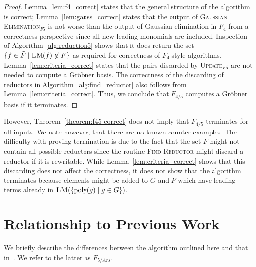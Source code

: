 \begin{proof}
Lemma~\ref{lem:f4_correct} states that the general structure of the algorithm is correct; Lemma~\ref{lem:gauss_correct} states that the output of \textsc{Gaussian Elimination}$_{F5}$ is not worse than the output of Gaussian elimination in $F_4$ from a correctness perspective since all new leading monomials are included. Inspection of Algorithm~\ref{alg:reduction5} shows that it does return the set $\{f \in \tilde{F} \mid \textsc{LM}(f) \not\in F\}$ as required for correctness of $F_4$-style algorithms. Lemma~\ref{lem:criteria_correct} states that the pairs discarded by \textsc{Update}$_{F5}$ are not needed to compute a Gröbner basis. The correctness of the discarding of reductors in Algorithm~\ref{alg:find_reductor} also follows from Lemma~\ref{lem:criteria_correct}. Thus, we conclude that $F_{4/5}$ computes a Gröbner basis if it terminates.
\end{proof}

However, Theorem~\ref{theorem:f45-correct} does not imply that $F_{4/5}$ terminates for all inputs. We note however, that there are no known counter examples. The difficulty with proving termination is due to the fact that the set $F$ might not contain all possible reductors since the routine \textsc{Find Reductor} might discard a reductor if it is rewritable. While Lemma~\ref{lem:criteria_correct} shows that this discarding does not affect the correctness, it does not show that the algorithm terminates because elements might be added to $G$ and $P$ which have leading terms already in $\textsc{LM}(\{\textnormal{poly}(g) \mid g \in G\})$.

\section{Relationship to Previous Work}

We briefly describe the differences between the algorithm outlined here and that in~\cite{ars:thesis2005}. We refer to the latter as $F_{5/Ars}$.

